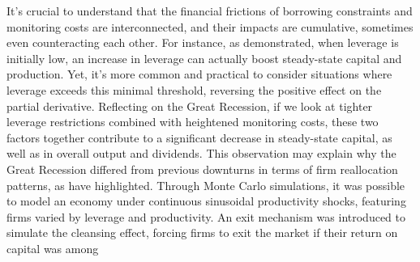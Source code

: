 It's crucial to understand that the financial frictions of borrowing constraints and monitoring costs are
interconnected, and their impacts are cumulative, sometimes even counteracting each other. For instance, as
demonstrated, when leverage is initially low, an increase in leverage can actually boost steady-state capital and
production. Yet, it's more common and practical to consider situations where leverage exceeds this minimal threshold,
reversing the positive effect on the partial derivative. Reflecting on the Great Recession, if we look at tighter
leverage restrictions combined with heightened monitoring costs, these two factors together contribute to a significant
decrease in steady-state capital, as well as in overall output and dividends. 
This observation may explain why the Great Recession differed from previous downturns in terms of firm reallocation
patterns, as \cite{FosHal16} have highlighted. Through Monte Carlo simulations, it was possible to model an economy
under continuous sinusoidal productivity shocks, featuring firms varied by leverage and productivity. An exit mechanism
was introduced to simulate the cleansing effect, forcing firms to exit the market if their return on capital was among
